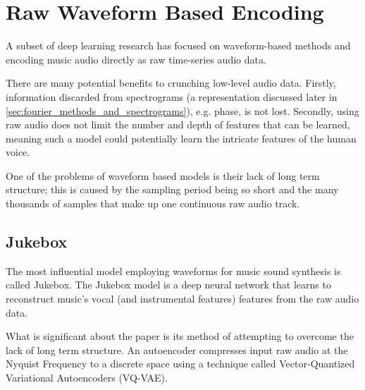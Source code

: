 \section{Raw Waveform Based Encoding}

A subset of deep learning research has focused on waveform-based methods and encoding music audio directly as raw time-series audio data.

There are many potential benefits to crunching low-level audio data. Firstly, information discarded from spectrograms (a representation discussed later in \ref{sec:fourier_methods_and_spectrograms}), e.g. phase, is not lost. Secondly, using raw audio does not limit the number and depth of features that can be learned, meaning such a model could potentially learn the intricate features of the human voice.

One of the problems of waveform based models is their lack of long term structure; this is caused by the sampling period being so short and the many thousands of samples that make up one continuous raw audio track\cite{JukeboxWebsite}.

\subsection{Jukebox}
\label{sec:jukebox}

The most influential model employing waveforms for music sound synthesis is called Jukebox\cite{Jukebox}. The Jukebox model is a deep neural network that learns to reconstruct music's vocal (and instrumental features) features from the raw audio data.

\vspace{0.5cm}
\vspace{0.5cm}

What is significant about the paper is its method of attempting to overcome the lack of long term structure. An autoencoder compresses input raw audio at the Nyquist Frequency to a discrete space using a technique called Vector-Quantized Variational Autoencoders (VQ-VAE)\cite{Jukebox}.

\vspace{0.5cm}
\vspace{0.5cm}

